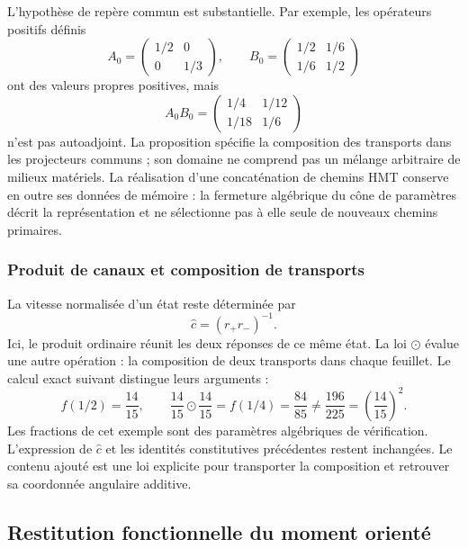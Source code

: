 L’hypothèse de repère commun est substantielle. Par exemple, les opérateurs
positifs définis
\[
 A_0=\begin{pmatrix}1/2&0\\0&1/3\end{pmatrix},\qquad
 B_0=\begin{pmatrix}1/2&1/6\\1/6&1/2\end{pmatrix}
\]
ont des valeurs propres positives, mais
\[
 A_0B_0=\begin{pmatrix}1/4&1/12\\1/18&1/6\end{pmatrix}
\]
n’est pas autoadjoint. La proposition spécifie la composition des
transports dans les projecteurs communs ; son domaine ne comprend pas un mélange
arbitraire de milieux matériels. La réalisation d’une concaténation de
chemins HMT conserve en outre ses données de mémoire : la fermeture algébrique du
cône de paramètres décrit la représentation et ne sélectionne pas à elle seule
de nouveaux chemins primaires.

\subsubsection{Produit de canaux et composition de transports}

La vitesse normalisée d’un état reste déterminée par
\[
 \widehat c=(r_+r_-)^{-1}.
\]
Ici, le produit ordinaire réunit les deux réponses de ce même état.
La loi $\odot$ évalue une autre opération : la composition de deux transports
dans chaque feuillet. Le calcul exact suivant distingue leurs arguments :
\begin{equation}
 f(1/2)=\frac{14}{15},\qquad
 \frac{14}{15}\odot\frac{14}{15}=f(1/4)=\frac{84}{85}
 \ne\frac{196}{225}=\left(\frac{14}{15}\right)^2.
 \label{cr28:comp-rational-example}
\end{equation}
Les fractions de cet exemple sont des paramètres algébriques de vérification.
L’expression de $\widehat c$ et les identités constitutives précédentes
restent inchangées. Le contenu ajouté est une loi explicite pour
transporter la composition et retrouver sa coordonnée angulaire additive.


\subsection{Restitution fonctionnelle du moment orienté}
\label{cr28:sec:catalan-recovery}

